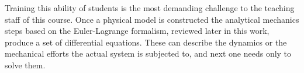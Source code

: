 Training this ability of students is the most demanding challenge  to the teaching staff of this course.
Once a physical model is constructed the analytical mechanics steps based on the Euler-Lagrange formalism, reviewed later in this work, produce a set of differential equations.
These can describe the dynamics or the mechanical efforts the actual system is subjected to, and next one needs only to solve them.
